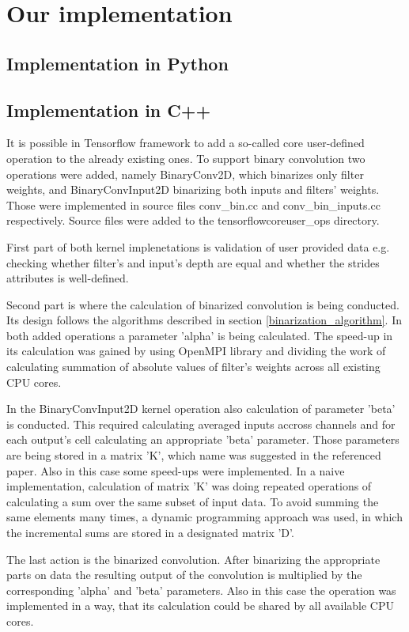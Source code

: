 \documentclass[licencjacka]{pracamgr}
\begin{document}
	\section{Our implementation}

		\subsection{Implementation in Python}
		\subsection{Implementation in C++}
		It is possible in Tensorflow framework to add a so-called core user-defined operation to the already existing ones. To support binary convolution two operations were added, namely BinaryConv2D, which binarizes only filter weights, and BinaryConvInput2D binarizing both inputs and filters' weights. Those were implemented in source files conv\_bin.cc and conv\_bin\_inputs.cc respectively. Source files were added to the \/tensorflow\/core\/user\_ops directory.

		First part of both kernel implenetations is validation of user provided data e.g. checking whether filter's and input's depth are equal and whether the strides attributes is well-defined.

		Second part is where the calculation of binarized convolution is being conducted. Its design follows the algorithms described in section \ref{binarization_algorithm}. In both added operations a parameter 'alpha' is being calculated. The speed-up in its calculation was gained by using OpenMPI library and dividing the work of calculating summation of absolute values of filter's weights across all existing CPU cores.

		In the BinaryConvInput2D kernel operation also calculation of parameter 'beta' is conducted. This required calculating averaged inputs accross channels and for each output's cell calculating an appropriate 'beta' parameter. Those parameters are being stored in a matrix 'K', which name was suggested in the referenced paper. Also in this case some speed-ups were implemented. In a naive implementation, calculation of matrix 'K' was doing repeated operations of calculating a sum over the same subset of input data. To avoid summing the same elements many times, a dynamic programming approach was used, in which the incremental sums are stored in a designated matrix 'D'.
	
		The last action is the binarized convolution. After binarizing the appropriate parts on data the resulting output of the convolution is multiplied by the corresponding 'alpha' and 'beta' parameters. Also in this case the operation was implemented in a way, that its calculation could be shared by all available CPU cores.
\end{document}
